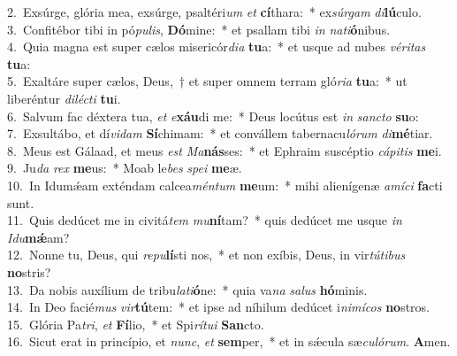 {2.~}Exsúrge, glória mea, exsúrge, psaltéri\textit{um} \textit{et} \textbf{cí}thara:~* ex\textit{súr}\textit{gam} \textit{di}\textbf{lú}culo.\\
{3.~}Confitébor tibi in pó\textit{pu}\textit{lis}, \textbf{Dó}mine:~* et psallam tibi \textit{in} \textit{na}\textit{ti}\textbf{ó}nibus.\\
{4.~}Quia magna est super cælos misericór\textit{di}\textit{a} \textbf{tu}a:~* et usque ad nubes \textit{vé}\textit{ri}\textit{tas} \textbf{tu}a:\\
{5.~}Exaltáre super cælos, Deus,~† et super omnem terram gló\textit{ri}\textit{a} \textbf{tu}a:~* ut liberéntur \textit{di}\textit{lé}\textit{cti} \textbf{tu}i.\\
{6.~}Salvum fac déxtera tua, \textit{et} \textit{e}\textbf{xáu}di me:~* Deus locútus est \textit{in} \textit{san}\textit{cto} \textbf{su}o:\\
{7.~}Exsultábo, et dí\textit{vi}\textit{dam} \textbf{Sí}chimam:~* et convállem tabernacu\textit{ló}\textit{rum} \textit{di}\textbf{mé}tiar.\\
{8.~}Meus est Gálaad, et meus \textit{est} \textit{Ma}\textbf{nás}ses:~* et Ephraim suscéptio \textit{cá}\textit{pi}\textit{tis} \textbf{me}i.\\
{9.~}Ju\textit{da} \textit{rex} \textbf{me}us:~* Moab le\textit{bes} \textit{spe}\textit{i} \textbf{me}æ.\\
{10.~}In Idumǽam exténdam calcea\textit{mén}\textit{tum} \textbf{me}um:~* mihi alienígenæ \textit{a}\textit{mí}\textit{ci} \textbf{fa}cti sunt.\\
{11.~}Quis dedúcet me in civitá\textit{tem} \textit{mu}\textbf{ní}tam?~* quis dedúcet me usque \textit{in} \textit{I}\textit{du}\textbf{mǽ}am?\\
{12.~}Nonne tu, Deus, qui \textit{re}\textit{pu}\textbf{lí}sti nos,~* et non exíbis, Deus, in vir\textit{tú}\textit{ti}\textit{bus} \textbf{no}stris?\\
{13.~}Da nobis auxílium de tribu\textit{la}\textit{ti}\textbf{ó}ne:~* quia va\textit{na} \textit{sa}\textit{lus} \textbf{hó}minis.\\
{14.~}In Deo facié\textit{mus} \textit{vir}\textbf{tú}tem:~* et ipse ad níhilum dedúcet i\textit{ni}\textit{mí}\textit{cos} \textbf{no}stros.\\
{15.~}Glória Pa\textit{tri}, \textit{et} \textbf{Fí}lio,~* et Spi\textit{rí}\textit{tu}\textit{i} \textbf{San}cto.\\
{16.~}Sicut erat in princípio, et \textit{nunc}, \textit{et} \textbf{sem}per,~* et in sǽcula sæ\textit{cu}\textit{ló}\textit{rum}. \textbf{A}men.\\
